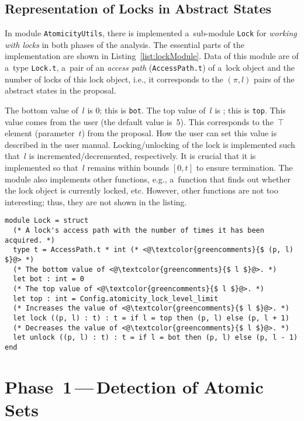 \subsection{Representation of Locks in Abstract States}

In module \texttt{AtomicityUtils}, there is implemented a~sub-module \texttt{Lock} for \emph{working with locks} in both phases of the analysis. The essential parts of the implementation are shown in Listing~\ref{list:lockModule}. Data of this module are of a~type \texttt{Lock.t}, a~pair of an \emph{access path} (\texttt{AccessPath.t}) of a~lock object and the number of locks of this lock object, i.e., it corresponds to the $ (\pi, l) $ pairs of the abstract states in the proposal.

The bottom value of~$ l $ is 0; this is \texttt{bot}. The top value of~$ l $ is ; this is \texttt{top}. This value comes from the user (the default value is~5). This corresponds to the~$ \top $ element (parameter~$ t $) from the proposal. How the user can set this value is described in the user manual. Locking/unlocking of the lock is implemented such that~$ l $ is incremented/decremented, respectively. It is crucial that it is implemented so that~$ l $ remains within bounds $ [0, t] $ to ensure termination. The module also implements other functions, e.g., a~function that finds out whether the lock object is currently locked, etc. However, other functions are not too interesting; thus, they are not shown in the listing.

\begin{lstlisting}[style=ocaml, label={list:lockModule}, float=hbt, caption={The implementation of a~module that represents \emph{locks in abstract states}}]
module Lock = struct
  (* A lock's access path with the number of times it has been acquired. *)
  type t = AccessPath.t * int (* <@\textcolor{greencomments}{$ (p, l) $}@> *)
  (* The bottom value of <@\textcolor{greencomments}{$ l $}@>. *)
  let bot : int = 0
  (* The top value of <@\textcolor{greencomments}{$ l $}@>. *)
  let top : int = Config.atomicity_lock_level_limit
  (* Increases the value of <@\textcolor{greencomments}{$ l $}@>. *)
  let lock ((p, l) : t) : t = if l = top then (p, l) else (p, l + 1)
  (* Decreases the value of <@\textcolor{greencomments}{$ l $}@>. *)
  let unlock ((p, l) : t) : t = if l = bot then (p, l) else (p, l - 1)
end
\end{lstlisting}


\section{\texorpdfstring{Phase~1\,---\,Detection of Atomic Sets}{Phase~1 - Detection of Atomic Sets}}
\label{sec:implementPhase1}

